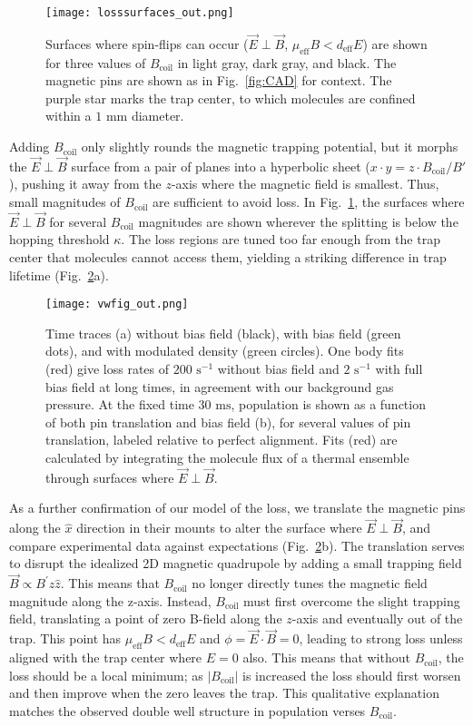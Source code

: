 \documentclass[%
 reprint,
 amsmath,amssymb,
 aps,
prl,
]{revtex4-1}
\newcommand{\bcl}{{$B_\text{coil}$}}
\newcommand{\epb}{{$\vec{E}\!\perp\!\vec{B}$}}
\begin{document}
\begin{figure}[tb]
\texttt{[image: losssurfaces\_out.png]}%
\caption{
Surfaces where spin-flips can occur (\epb{}, $\mu_\text{eff}B<d_\text{eff}E$) are shown for three values of \bcl{} in light gray, dark gray, and black. 
The magnetic pins are shown as in Fig.~\ref{fig:CAD} for context. 
The purple star marks the trap center, to which molecules are confined within a \raisebox{2.5px}{\texttildelow} $\!\!1\text{ mm}$ diameter.
}
\label{fig:LSurfs}
\end{figure}

Adding \bcl{} only slightly rounds the magnetic trapping potential, but it morphs the \epb{} surface from a pair of planes into a hyperbolic sheet ($x\cdot y= z\cdot B_\text{coil}/B'$), pushing it away from the $z$-axis where the magnetic field is smallest. 
Thus, small magnitudes of \bcl{} are sufficient to avoid loss. 
In Fig.~\ref{fig:LSurfs}, the surfaces where \epb{} for several \bcl{} magnitudes are shown wherever the splitting is below the hopping threshold $\kappa$. 
The loss regions are tuned too far enough from the trap center that molecules cannot access them, yielding a striking difference in trap lifetime (Fig.~\ref{fig:WVplot}a).

\begin{figure}[tb]
\texttt{[image: vwfig\_out.png]}%
\caption{
Time traces (a) without bias field (black), with bias field (green dots), and with modulated density (green circles). 
One body fits (red) give loss rates of $200\text{ s}^{-1}$ without bias field and $2\text{ s}^{-1}$ with full bias field at long times, in agreement with our background gas pressure. 
At the fixed time $30\text{ ms}$, population is shown as a function of both pin translation and bias field (b), for several values of pin translation, labeled relative to perfect alignment. 
Fits (red) are calculated by integrating the molecule flux of a thermal ensemble through surfaces where \epb.
\label{fig:WVplot}}
\end{figure}

As a further confirmation of our model of the loss, we translate the magnetic pins along the $\hat{x}$ direction in their mounts to alter the surface where \epb{}, and compare experimental data against expectations (Fig.~\ref{fig:WVplot}b). 
The translation serves to disrupt the idealized 2D magnetic quadrupole by adding a small trapping field $\vec{B}\propto B^\prime z\hat{z}$. 
This means that \bcl{} no longer directly tunes the magnetic field magnitude along the z-axis. 
Instead, \bcl{} must first overcome the slight trapping field, translating a point of zero B-field along the $z$-axis and eventually out of the trap. This point has $\mu_\text{eff}B<d_\text{eff}E$ and $\phi=\vec{E}\cdot\vec{B}=0$, leading to strong loss unless aligned with the trap center where $E=0$ also. 
This means that without \bcl{}, the loss should be a local minimum; as $|B_\text{coil}|$ is increased the loss should first worsen and then improve when the zero leaves the trap. 
This qualitative explanation matches the observed double well structure in population verses \bcl.
\end{document}
